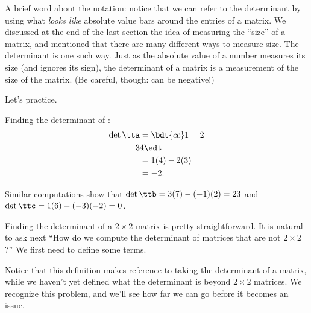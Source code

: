 A brief word about the notation: notice that we can refer to the determinant by using what \textit{looks like} absolute value bars around the entries of a matrix. We discussed at the end of the last section the idea of measuring the ``size'' of a matrix, and mentioned that there are many different ways to measure size. The determinant is one such way. Just as the absolute value of a number measures its size (and ignores its sign), the determinant of a matrix is a measurement of the size of the matrix. (Be careful, though: \det{\tta} can be negative!)

Let's practice.

\medskip

{Finding the determinant of \tta:
\begin{align*}
\det{\tta} &= \bdt{cc}1&2\\3&4\edt \\
						&= 1(4) - 2(3)\\
						&= -2.
\end{align*}

Similar computations show that $\det{\ttb} = 3(7)- (-1)(2) = 23$ and $\det{\ttc} = 1(6) - (-3)(-2) = 0$.}

\medskip

Finding the determinant of a $2\times2$ matrix is pretty straightforward. It is natural to ask next ``How do we compute the determinant of matrices that are not $2\times2$?'' We first need to define some terms. 

\smallskip


\smallskip

Notice that this definition makes reference to taking the determinant of a matrix, while we haven't yet defined what the determinant is beyond $2\times 2$ matrices. We recognize this problem, and we'll see how far we can go before it becomes an issue.

